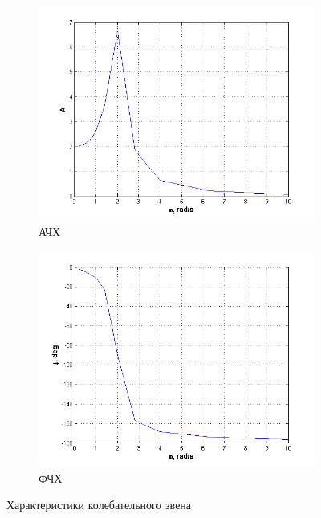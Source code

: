 \documentclass[a4paper, 11pt, russian]{article}
\begin{document}
	\begin{figure}[ht!]\ContinuedFloat
		\centering
        \begin{subfigure}[h]{0.48\textwidth}
            \includegraphics[width = \textwidth]{oscillatoryLinkAFR}
            \caption{АЧХ}
        \end{subfigure}
        \hfill
        \begin{subfigure}[h]{0.48\textwidth}
            \includegraphics[width = \textwidth]{oscillatoryLinkPFR}
            \caption{ФЧХ}
        \end{subfigure}
        \caption{Характеристики колебательного звена}
    \end{figure}
    
\end{document}

